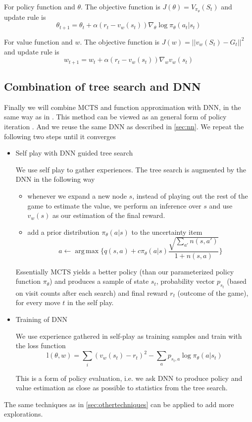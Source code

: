 \documentclass{article}
\DeclareMathOperator*{\argmax}{arg\,max}
\begin{document}
For policy function and $\theta$. The objective function is  $J(\theta) = V_{\pi_{\theta}}(S_t)$ and update rule is
$$ \theta_{t+1} = \theta_{t} + \alpha 
( r_t  - v_w(s_t))
\nabla_{\theta} \log \pi_{\theta}(a_t|s_t) 
$$

For value function and $w$. The objective function is  $J(w) = ||v_w(S_t) - G_t||^2$ and update rule is 
$$ w_{t+1} = w_{t} + \alpha 
( r_t  - v_w(s_t))
\nabla_{w} v_w(s_t) 
$$
\subsection{Combination of tree search and DNN}
\label{sec:combined}
Finally we will combine MCTS and function approximation with DNN, in the same way as in \cite{silver2017masteringalphagozero}. This method can be viewed as an general form of policy iteration \cite{sutton2018reinforcement}. And we reuse the same DNN as described in \ref{sec:nn}. We repeat the following two steps until it converges

\begin{itemize}
  \item
    Self play with DNN guided tree search

    We use self play to gather experiences. The tree search is augmented by the DNN in the following way
    \begin{itemize}
   \item
    whenever we expand a new node $s$, instead of playing out the rest of the game to estimate the value, we perform an inference over $s$ and use $v_w(s)$ as our estimation of the final reward. 
  \item
    add a prior distribution $\pi_{\theta}(a|s)$ to the uncertainty item
$$a  \gets \argmax \{ q(s, a) + c \pi_{\theta}(a|s) \frac{\sqrt{\sum_{a'}n(s, a')}}{1 + n(s,a)} \}$$
\end{itemize}
   
Essentially MCTS yields a better policy (than our parameterized policy function $\pi_{\theta}$) and produces a sample of state $s_t$, probability vector $p_{s_t}$ (based on visit counts after each search) and final reward $r_t$ (outcome of the game), for every move $t$ in the self play.  


  \item
    Training of DNN
    
    We use experience gathered in self-play as training samples and train with the loss function
    $$ \text{l}(\theta, w) = \sum_i (v_w(s_t) - r_t)^2 - \sum_a p_{s_t, a} \log \pi_{\theta}(a|s_t)  $$
    
    This is a form of policy evaluation, i.e. we ask DNN to produce policy and value estimation as close as possible to statistics from the tree search.  

\end{itemize}
The same techniques as in \ref{sec:othertechniques} can be applied to add more explorations.
\end{document}
